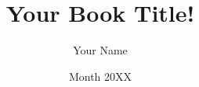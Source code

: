 


\title{
    Your Book Title!\\
    {\it }
}
\author{Your Name}
\date{Month 20XX}

	

\maketitle


\tableofcontents


% 

\mainmatter


% 
% 


